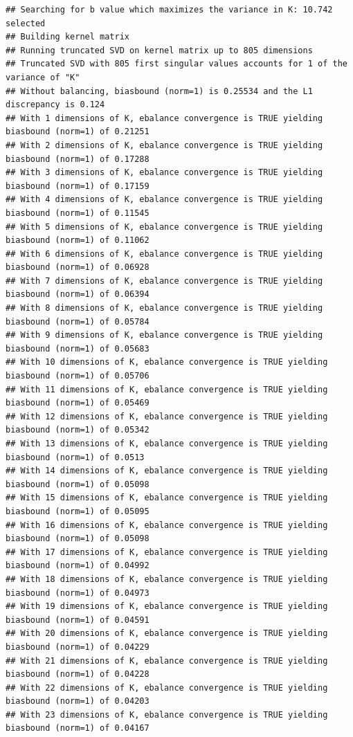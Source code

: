 \documentclass[
]{article}
\begin{document}
\begin{verbatim}
## Searching for b value which maximizes the variance in K: 10.742 selected 
## Building kernel matrix
## Running truncated SVD on kernel matrix up to 805 dimensions 
## Truncated SVD with 805 first singular values accounts for 1 of the variance of "K" 
## Without balancing, biasbound (norm=1) is 0.25534 and the L1 discrepancy is 0.124 
## With 1 dimensions of K, ebalance convergence is TRUE yielding biasbound (norm=1) of 0.21251  
## With 2 dimensions of K, ebalance convergence is TRUE yielding biasbound (norm=1) of 0.17288  
## With 3 dimensions of K, ebalance convergence is TRUE yielding biasbound (norm=1) of 0.17159  
## With 4 dimensions of K, ebalance convergence is TRUE yielding biasbound (norm=1) of 0.11545  
## With 5 dimensions of K, ebalance convergence is TRUE yielding biasbound (norm=1) of 0.11062  
## With 6 dimensions of K, ebalance convergence is TRUE yielding biasbound (norm=1) of 0.06928  
## With 7 dimensions of K, ebalance convergence is TRUE yielding biasbound (norm=1) of 0.06394  
## With 8 dimensions of K, ebalance convergence is TRUE yielding biasbound (norm=1) of 0.05784  
## With 9 dimensions of K, ebalance convergence is TRUE yielding biasbound (norm=1) of 0.05683  
## With 10 dimensions of K, ebalance convergence is TRUE yielding biasbound (norm=1) of 0.05706  
## With 11 dimensions of K, ebalance convergence is TRUE yielding biasbound (norm=1) of 0.05469  
## With 12 dimensions of K, ebalance convergence is TRUE yielding biasbound (norm=1) of 0.05342  
## With 13 dimensions of K, ebalance convergence is TRUE yielding biasbound (norm=1) of 0.0513  
## With 14 dimensions of K, ebalance convergence is TRUE yielding biasbound (norm=1) of 0.05098  
## With 15 dimensions of K, ebalance convergence is TRUE yielding biasbound (norm=1) of 0.05095  
## With 16 dimensions of K, ebalance convergence is TRUE yielding biasbound (norm=1) of 0.05098  
## With 17 dimensions of K, ebalance convergence is TRUE yielding biasbound (norm=1) of 0.04992  
## With 18 dimensions of K, ebalance convergence is TRUE yielding biasbound (norm=1) of 0.04973  
## With 19 dimensions of K, ebalance convergence is TRUE yielding biasbound (norm=1) of 0.04591  
## With 20 dimensions of K, ebalance convergence is TRUE yielding biasbound (norm=1) of 0.04229  
## With 21 dimensions of K, ebalance convergence is TRUE yielding biasbound (norm=1) of 0.04228  
## With 22 dimensions of K, ebalance convergence is TRUE yielding biasbound (norm=1) of 0.04203  
## With 23 dimensions of K, ebalance convergence is TRUE yielding biasbound (norm=1) of 0.04167  

\end{verbatim}
\end{document}
